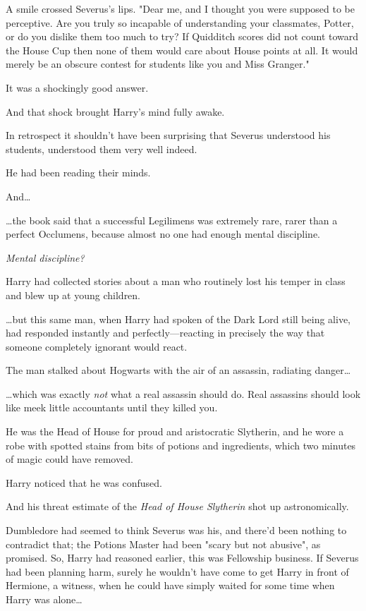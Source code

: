A smile crossed Severus's lips. "Dear me, and I thought you were supposed to be 
perceptive. Are you truly so incapable of understanding your classmates, 
Potter, or do you dislike them too much to try? If Quidditch scores did not 
count toward the House Cup then none of them would care about House points at 
all. It would merely be an obscure contest for students like you and Miss 
Granger."

It was a shockingly good answer.

And that shock brought Harry's mind fully awake.

In retrospect it shouldn't have been surprising that Severus understood his 
students, understood them very well indeed.

He had been reading their minds.

And{\ldots}

{\ldots}the book said that a successful Legilimens was extremely rare, rarer 
than a perfect Occlumens, because almost no one had enough mental discipline.

\emph{Mental discipline?}

Harry had collected stories about a man who routinely lost his temper in class 
and blew up at young children.

{\ldots}but this same man, when Harry had spoken of the Dark Lord still being 
alive, had responded instantly and perfectly---reacting in precisely the way 
that someone completely ignorant would react.

The man stalked about Hogwarts with the air of an assassin, radiating 
danger{\ldots}

{\ldots}which was exactly \emph{not} what a real assassin should do. Real 
assassins should look like meek little accountants until they killed you.

He was the Head of House for proud and aristocratic Slytherin, and he wore a 
robe with spotted stains from bits of potions and ingredients, which two 
minutes of magic could have removed.

Harry noticed that he was confused.

And his threat estimate of the \emph{Head of House Slytherin} shot up 
astronomically.

Dumbledore had seemed to think Severus was his, and there'd been nothing to 
contradict that; the Potions Master had been "scary but not abusive", as 
promised. So, Harry had reasoned earlier, this was Fellowship business. If 
Severus had been planning harm, surely he wouldn't have come to get Harry in 
front of Hermione, a witness, when he could have simply waited for some time 
when Harry was alone{\ldots}

